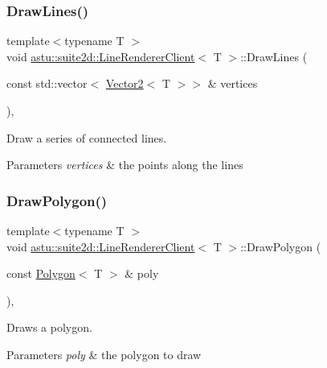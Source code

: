 \subsubsection{\texorpdfstring{Draw\+Lines()}{DrawLines()}}
{\footnotesize\ttfamily template$<$typename T $>$ \\
void \hyperlink{classastu_1_1suite2d_1_1LineRendererClient}{astu\+::suite2d\+::\+Line\+Renderer\+Client}$<$ T $>$\+::Draw\+Lines (\begin{DoxyParamCaption}\item[{const std\+::vector$<$ \hyperlink{classastu_1_1Vector2}{Vector2}$<$ T $>$$>$ \&}]{vertices }\end{DoxyParamCaption})\hspace{0.3cm}{\ttfamily [inline]}, {\ttfamily [protected]}}

Draw a series of connected lines.


\begin{DoxyParams}{Parameters}
{\em vertices} & the points along the lines \\
\hline
\end{DoxyParams}
\mbox{\label{classastu_1_1suite2d_1_1LineRendererClient_ac8cfa3e2e94d0bb5e787191146f043ed}} 
\subsubsection{\texorpdfstring{Draw\+Polygon()}{DrawPolygon()}}
{\footnotesize\ttfamily template$<$typename T $>$ \\
void \hyperlink{classastu_1_1suite2d_1_1LineRendererClient}{astu\+::suite2d\+::\+Line\+Renderer\+Client}$<$ T $>$\+::Draw\+Polygon (\begin{DoxyParamCaption}\item[{const \hyperlink{classastu_1_1Polygon}{Polygon}$<$ T $>$ \&}]{poly }\end{DoxyParamCaption})\hspace{0.3cm}{\ttfamily [inline]}, {\ttfamily [protected]}}

Draws a polygon.


\begin{DoxyParams}{Parameters}
{\em poly} & the polygon to draw \\
\hline
\end{DoxyParams}
\mbox{\label{classastu_1_1suite2d_1_1LineRendererClient_af90e47acfd9aff3137395120e12ad77f}} 
